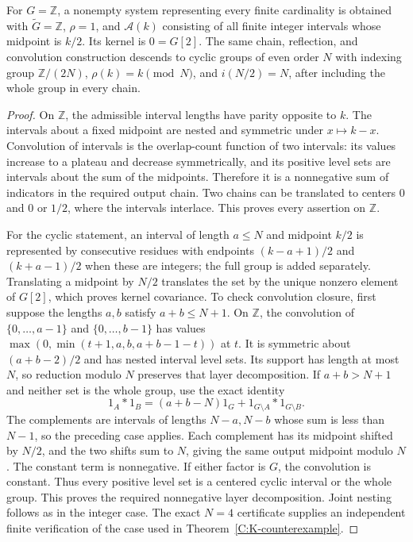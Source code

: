 \begin{proposition}
\label{C:integer-system}
For $G=\mathbb Z$, a nonempty system representing every finite cardinality is obtained with $\widetilde G=\mathbb Z$, $\rho=1$, and $\mathcal A(k)$ consisting of all finite integer intervals whose midpoint is $k/2$. Its kernel is $0=G[2]$. The same chain, reflection, and convolution construction descends to cyclic groups of even order $N$ with indexing group $\mathbb Z/(2N)$, $\rho(k)=k\pmod N$, and $i(N/2)=N$, after including the whole group in every chain.
\end{proposition}
\begin{proof}
On $\mathbb Z$, the admissible interval lengths have parity opposite to $k$. The intervals about a fixed midpoint are nested and symmetric under $x\mapsto k-x$. Convolution of intervals is the overlap-count function of two intervals: its values increase to a plateau and decrease symmetrically, and its positive level sets are intervals about the sum of the midpoints. Therefore it is a nonnegative sum of indicators in the required output chain. Two chains can be translated to centers $0$ and $0$ or $1/2$, where the intervals interlace. This proves every assertion on $\mathbb Z$.

For the cyclic statement, an interval of length $a\leq N$ and midpoint $k/2$ is represented by consecutive residues with endpoints $(k-a+1)/2$ and $(k+a-1)/2$ when these are integers; the full group is added separately. Translating a midpoint by $N/2$ translates the set by the unique nonzero element of $G[2]$, which proves kernel covariance. To check convolution closure, first suppose the lengths $a,b$ satisfy $a+b\leq N+1$. On $\mathbb Z$, the convolution of $\{0,\ldots,a-1\}$ and $\{0,\ldots,b-1\}$ has values
$\max(0,\min(t+1,a,b,a+b-1-t))$ at $t$. It is symmetric about $(a+b-2)/2$ and has nested interval level sets. Its support has length at most $N$, so reduction modulo $N$ preserves that layer decomposition. If $a+b>N+1$ and neither set is the whole group, use the exact identity
\[
1_A*1_B=(a+b-N)1_G+1_{G\setminus A}*1_{G\setminus B}.
\]
The complements are intervals of lengths $N-a,N-b$ whose sum is less than $N-1$, so the preceding case applies. Each complement has its midpoint shifted by $N/2$, and the two shifts sum to $N$, giving the same output midpoint modulo $N$. The constant term is nonnegative. If either factor is $G$, the convolution is constant. Thus every positive level set is a centered cyclic interval or the whole group. This proves the required nonnegative layer decomposition. Joint nesting follows as in the integer case. The exact $N=4$ certificate supplies an independent finite verification of the case used in Theorem~\ref{C:K-counterexample}.
\end{proof}

